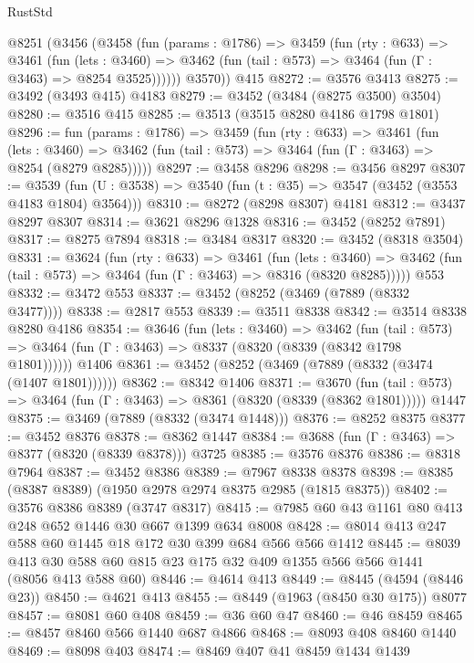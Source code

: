 \begin{lexlean}{RustStd}
\begin{coremodule}
    @8251
      (@3456
        (@3458
          (fun (params : @1786) =>
          @3459
            (fun (rty : @633) =>
            @3461
              (fun (lets : @3460) =>
              @3462 (fun (tail : @573) => @3464 (fun (Γ : @3463) => @8254 @3525))))))
        @3570))
    @415
@8272 := @3576 @3413
@8275 := @3492 (@3493 @415) @4183
@8279 := @3452 (@3484 (@8275 @3500) @3504)
@8280 := @3516 @415
@8285 := @3513 (@3515 @8280 @4186 @1798 @1801)
@8296 := fun (params : @1786) =>
  @3459
    (fun (rty : @633) =>
    @3461
      (fun (lets : @3460) =>
      @3462 (fun (tail : @573) => @3464 (fun (Γ : @3463) => @8254 (@8279 @8285)))))
@8297 := @3458 @8296
@8298 := @3456 @8297
@8307 := @3539 (fun (U : @3538) => @3540 (fun (t : @35) => @3547 (@3452 (@3553 @4183 @1804) @3564)))
@8310 := @8272 (@8298 @8307) @4181
@8312 := @3437 @8297 @8307
@8314 := @3621 @8296 @1328
@8316 := @3452 (@8252 @7891)
@8317 := @8275 @7894
@8318 := @3484 @8317
@8320 := @3452 (@8318 @3504)
@8331 := @3624
    (fun (rty : @633) =>
    @3461
      (fun (lets : @3460) =>
      @3462 (fun (tail : @573) => @3464 (fun (Γ : @3463) => @8316 (@8320 @8285)))))
    @553
@8332 := @3472 @553
@8337 := @3452 (@8252 (@3469 (@7889 (@8332 @3477))))
@8338 := @2817 @553
@8339 := @3511 @8338
@8342 := @3514 @8338 @8280 @4186
@8354 := @3646
    (fun (lets : @3460) =>
    @3462
      (fun (tail : @573) => @3464 (fun (Γ : @3463) => @8337 (@8320 (@8339 (@8342 @1798 @1801))))))
    @1406
@8361 := @3452 (@8252 (@3469 (@7889 (@8332 (@3474 (@1407 @1801))))))
@8362 := @8342 @1406
@8371 := @3670
    (fun (tail : @573) => @3464 (fun (Γ : @3463) => @8361 (@8320 (@8339 (@8362 @1801)))))
    @1447
@8375 := @3469 (@7889 (@8332 (@3474 @1448)))
@8376 := @8252 @8375
@8377 := @3452 @8376
@8378 := @8362 @1447
@8384 := @3688 (fun (Γ : @3463) => @8377 (@8320 (@8339 @8378))) @3725
@8385 := @3576 @8376
@8386 := @8318 @7964
@8387 := @3452 @8386
@8389 := @7967 @8338 @8378
@8398 := @8385 (@8387 @8389) (@1950 @2978 @2974 @8375 @2985 (@1815 @8375))
@8402 := @3576 @8386 @8389 (@3747 @8317)
@8415 := @7985 @60 @43 @1161 @80 @413 @248 @652 @1446 @30 @667 @1399 @634 @8008
@8428 := @8014 @413 @247 @588 @60 @1445 @18 @172 @30 @399 @684 @566 @566 @1412
@8445 := @8039 @413 @30 @588 @60 @815 @23 @175 @32 @409 @1355 @566 @566 @1441 (@8056 @413 @588 @60)
@8446 := @4614 @413
@8449 := @8445 (@4594 (@8446 @23))
@8450 := @4621 @413
@8455 := @8449 (@1963 (@8450 @30 @175)) @8077
@8457 := @8081 @60 @408
@8459 := @36 @60 @47
@8460 := @46 @8459
@8465 := @8457 @8460 @566 @1440 @687 @4866
@8468 := @8093 @408 @8460 @1440
@8469 := @8098 @403
@8474 := @8469 @407 @41 @8459 @1434 @1439

\end{coremodule}
\end{lexlean}
